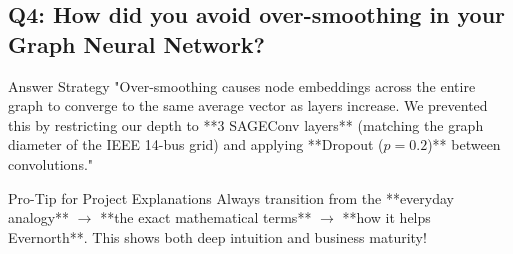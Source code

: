 \documentclass[11pt,a4paper]{article}
\begin{document}
\subsection*{Q4: How did you avoid over-smoothing in your Graph Neural Network?}
\begin{ansbox}{Answer Strategy}
"Over-smoothing causes node embeddings across the entire graph to converge to the same average vector as layers increase. We prevented this by restricting our depth to **3 SAGEConv layers** (matching the graph diameter of the IEEE 14-bus grid) and applying **Dropout ($p=0.2$)** between convolutions."
\end{ansbox}

\begin{trapbox}{Pro-Tip for Project Explanations}
Always transition from the **everyday analogy** $\to$ **the exact mathematical terms** $\to$ **how it helps Evernorth**. This shows both deep intuition and business maturity!
\end{trapbox}
\end{document}
